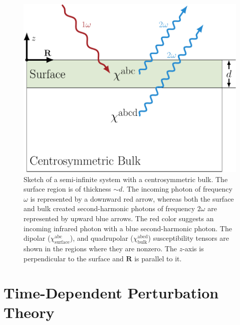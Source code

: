 \begin{figure}[t]
\centering
\includegraphics[scale=0.6]{content/figures/diag-system}
\caption[Sketch of a semi-infinite system with a centrosymmetric bulk.]
{Sketch of a semi-infinite system with a centrosymmetric bulk. The surface
region is of thickness $\sim d$. The incoming photon of frequency $\omega$ is
represented by a downward red arrow, whereas both the surface and bulk created
second-harmonic photons of frequency $2\omega$ are represented by upward blue
arrows. The red color suggests an incoming infrared photon with a blue
second-harmonic photon. The dipolar ($\chi^{\mathrm{abc}}_{\mathrm{surface}}$),
and quadrupolar ($\chi^{\mathrm{abcd}}_{\mathrm{bulk}}$) susceptibility tensors
are shown in the regions where they are nonzero. The $z$-axis is perpendicular
to the surface and $\mathbf{R}$ is parallel to it.}
\label{fig:fsystem}
\end{figure}



\section{Time-Dependent Perturbation Theory}\label{tdpt}

